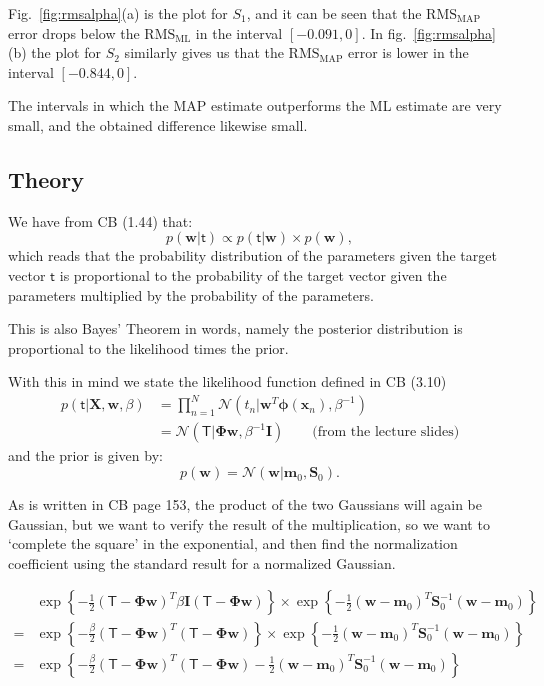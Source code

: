 \documentclass{article}
\newcommand{\vect}[1]{\ensuremath{\boldsymbol{\mathbf{#1}}}\xspace}
\newcommand{\Target}{\vect{\mathsf{T}}}
\newcommand{\vPhi}{\vect{\Phi}}
\newcommand{\vw}{\vect{w}}
\newcommand{\Szero}{\vect{S}_0}
\newcommand{\mzero}{\vect{m}_0}
\newcommand{\target}{\vect{\mathsf{t}}}
\begin{document}
Fig.~\ref{fig:rmsalpha}(a) is the plot for $S_1$, and it can be seen
that the $\mathrm{RMS}_\mathrm{MAP}$ error drops below the
$\mathrm{RMS}_\mathrm{ML}$ in the interval $[-0.091,0]$. In
fig.~\ref{fig:rmsalpha}(b) the plot for $S_2$ similarly gives us that
the $\mathrm{RMS}_\mathrm{MAP}$ error is lower in the interval
$[-0.844,0]$.

The intervals in which the MAP estimate outperforms the ML estimate
are very small, and the obtained difference likewise small.

\newpage
\subsection{Theory}

We have from CB (1.44) that:
\[
p(\vect{w}|\vect{\mathsf{t}}) \propto p(\vect{\mathsf{t}}|\vect{w})\times p(\vect{w}),
\]
which reads that the probability distribution of the parameters given
the target vector $\vect{\mathsf{t}}$ is proportional to the
probability of the target vector given the parameters multiplied by
the probability of the parameters.

This is also Bayes' Theorem in words, namely the posterior
distribution is proportional to the likelihood times the prior.

With this in mind we state the likelihood function defined in CB
(3.10)
\begin{align*}
  p(\target |\vect{X}, \vect{w}, \beta) &= \prod_{n=1}^N \mathcal{N}(t_n | \vect{w}^T\vect{\phi}(\vect{x}_n), \beta^{-1})\label{eq:likelihood}\\
  &= \mathcal{N}(\vect{\mathsf{T}} | \vect{\Phi}\vect{w}, \beta^{-1}\vect{I}) \qquad\text{(from the lecture slides)}
\end{align*}
and the prior is given by:
\[
  p(\vect{w}) = \mathcal{N}(\vect{w}|\vect{m}_0,\vect{S}_0).
\]

As is written in CB page 153, the product of the two Gaussians will
again be Gaussian, but we want to verify the result of the
multiplication, so we want to `complete the square' in the
exponential, and then find the normalization coefficient using the
standard result for a normalized Gaussian.

\begin{align}
  \nonumber  & \exp\left\{-\frac{1}{2}(\Target - \vPhi\vw)^T \beta\vect{I} (\Target -
  \vPhi\vw)\right\} \times \exp\left\{ -\frac{1}{2}(\vw -
  \mzero)^T\Szero^{-1}(\vw - \mzero)\right\}\\
  \nonumber = & \exp\left\{-\frac{\beta}{2}(\Target - \vPhi\vw)^T (\Target -
  \vPhi\vw)\right\} \times \exp\left\{ -\frac{1}{2}(\vw -
  \mzero)^T\Szero^{-1}(\vw - \mzero)\right\}\\
  = & \exp\left\{-\frac{\beta}{2}(\Target - \vPhi\vw)^T (\Target -
  \vPhi\vw) -\frac{1}{2}(\vw - \mzero)^T\Szero^{-1}(\vw - \mzero)\right\}\label{eq:expgauss}
\end{align}
\end{document}
